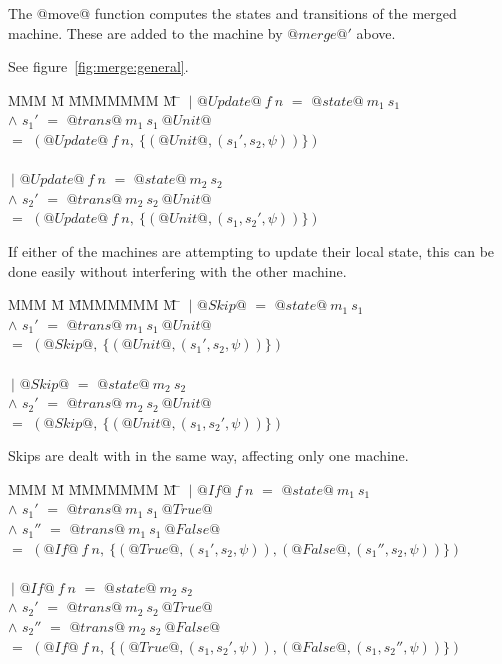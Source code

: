 The @move@ function computes the states and transitions of the merged machine.
These are added to the machine by $@merge@'$ above.

See figure~\ref{fig:merge:general}.



\begin{tabbing}
MMM \= M \= MMMMMMM \= M \=\kill
 \> $~|$ \> $@Update@~f~n$ \> $=$ \> $@state@~m_1~s_1$ \\
 \> $\wedge$ \> $s_1'$     \> $=$ \> $@trans@~m_1~s_1~@Unit@$ \\
 \> $=$ \> $(@Update@~f~n,~\{(@Unit@, (s_1',s_2,\psi))\})$ \\
\\
 \> $~|$ \> $@Update@~f~n$ \> $=$ \> $@state@~m_2~s_2$ \\
 \> $\wedge$ \> $s_2'$     \> $=$ \> $@trans@~m_2~s_2~@Unit@$ \\
 \> $=$ \> $(@Update@~f~n,~\{(@Unit@, (s_1,s_2',\psi))\})$ \\
\end{tabbing}

If either of the machines are attempting to update their local state, this can be done easily without interfering with the other machine.

\begin{tabbing}
MMM \= M \= MMMMMMM \= M \=\kill
 \> $~|$ \> $@Skip@$ \> $=$ \> $@state@~m_1~s_1$ \\
 \> $\wedge$ \> $s_1'$     \> $=$ \> $@trans@~m_1~s_1~@Unit@$ \\
 \> $=$ \> $(@Skip@,~\{(@Unit@, (s_1',s_2,\psi))\})$ \\
\\
 \> $~|$ \> $@Skip@$ \> $=$ \> $@state@~m_2~s_2$ \\
 \> $\wedge$ \> $s_2'$     \> $=$ \> $@trans@~m_2~s_2~@Unit@$ \\
 \> $=$ \> $(@Skip@,~\{(@Unit@, (s_1,s_2',\psi))\})$ \\
\end{tabbing}

Skips are dealt with in the same way, affecting only one machine.

\begin{tabbing}
MMM \= M \= MMMMMMM \= M \=\kill
 \> $~|$ \> $@If@~f~n$ \> $=$ \> $@state@~m_1~s_1$ \\
 \> $\wedge$ \> $s_1'$     \> $=$ \> $@trans@~m_1~s_1~@True@$ \\
 \> $\wedge$ \> $s_1''$     \> $=$ \> $@trans@~m_1~s_1~@False@$ \\
 \> $=$ \> $(@If@~f~n,~\{(@True@, (s_1',s_2,\psi)), (@False@, (s_1'', s_2, \psi))\})$ \\
\\
 \> $~|$ \> $@If@~f~n$ \> $=$ \> $@state@~m_2~s_2$ \\
 \> $\wedge$ \> $s_2'$     \> $=$ \> $@trans@~m_2~s_2~@True@$ \\
 \> $\wedge$ \> $s_2''$     \> $=$ \> $@trans@~m_2~s_2~@False@$ \\
 \> $=$ \> $(@If@~f~n,~\{(@True@, (s_1,s_2',\psi)), (@False@, (s_1, s_2'', \psi))\})$ \\
\end{tabbing}

